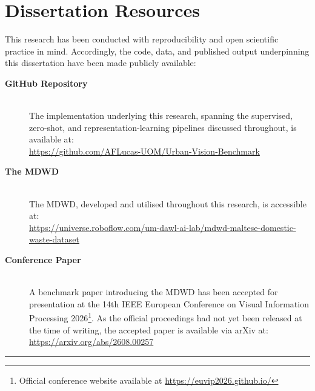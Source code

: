 \chapter{Dissertation Resources}
\noindent This research has been conducted with reproducibility and open scientific practice in mind. Accordingly, the code, data, and published output underpinning this dissertation have been made publicly available: 

\begin{description}
    \item[\textbf{GitHub Repository}] \hfill \\
    The implementation underlying this research, spanning the supervised, zero-shot, and representation-learning pipelines discussed throughout, is available at:\\
    \url{https://github.com/AFLucas-UOM/Urban-Vision-Benchmark}
    
    \item[\textbf{The \gls{MDWD}}] \hfill \\
    The \gls{MDWD}, developed and utilised throughout this research, is accessible at:\\
    \url{https://universe.roboflow.com/um-dawl-ai-lab/mdwd-maltese-domestic-waste-dataset}
    
    \item[\textbf{Conference Paper}] \hfill \\
    A benchmark paper introducing the \gls{MDWD} has been accepted for presentation at the 14th \gls{IEEE} European Conference on Visual Information Processing 2026\footnote{Official conference website available at \url{https://euvip2026.github.io/}}. As the official proceedings had not yet been released at the time of writing, the accepted paper is available via arXiv at:\\
    \url{https://arxiv.org/abs/2608.00257}
    
\end{description}

\vspace{0.5cm}
\noindent\rule{\linewidth}{0.5pt}